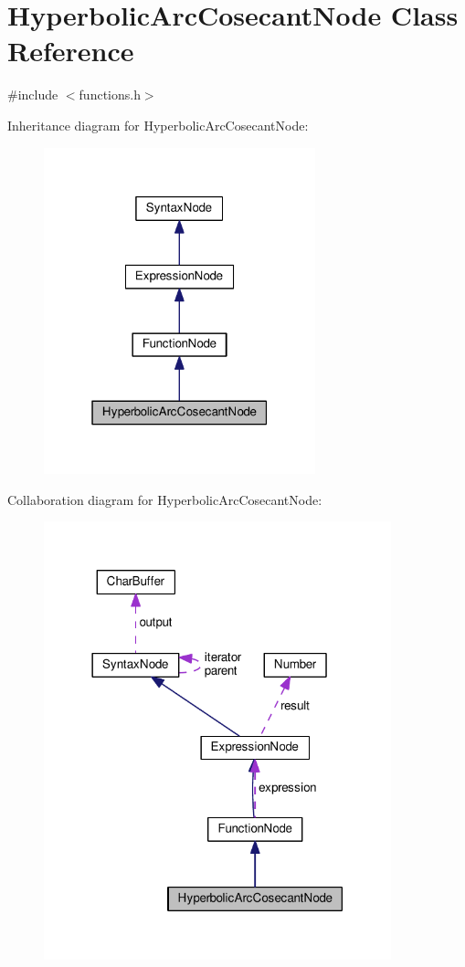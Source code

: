 \hypertarget{classHyperbolicArcCosecantNode}{}\section{Hyperbolic\+Arc\+Cosecant\+Node Class Reference}
\label{classHyperbolicArcCosecantNode}


{\ttfamily \#include $<$functions.\+h$>$}



Inheritance diagram for Hyperbolic\+Arc\+Cosecant\+Node\+:
\nopagebreak
\begin{figure}[H]
\begin{center}
\leavevmode
\includegraphics[width=223pt]{dc/d10/classHyperbolicArcCosecantNode__inherit__graph}
\end{center}
\end{figure}


Collaboration diagram for Hyperbolic\+Arc\+Cosecant\+Node\+:
\nopagebreak
\begin{figure}[H]
\begin{center}
\leavevmode
\includegraphics[width=285pt]{da/d32/classHyperbolicArcCosecantNode__coll__graph}
\end{center}
\end{figure}

